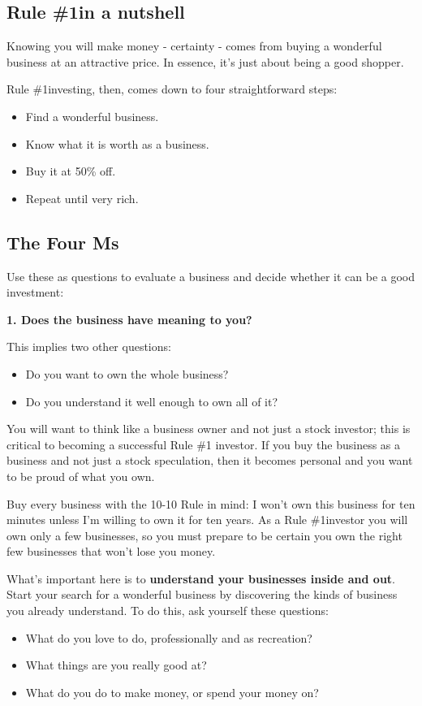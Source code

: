 \documentclass[a4paper]{jpconf}
\newcommand{\ruleone}{Rule \#1\space}
\begin{document}
\subsection{\ruleone in a nutshell}

Knowing you will make money - certainty - comes from buying a
wonderful business at an attractive price. In essence, it's just about
being a good shopper. 

\ruleone investing, then, comes down to four straightforward steps:
\begin{itemize}
\item Find a wonderful business.
\item Know what it is worth as a business.
\item Buy it at 50\% off.
\item Repeat until very rich.
\end{itemize}

\subsection{The Four Ms}

Use these as questions to evaluate a business and decide whether it
can be a good investment: 

{\bf 1. Does the business have meaning to you?}

This implies two other questions:
\begin{itemize}
\item Do you want to own the whole business?
\item Do you understand it well enough to own all of it?
\end{itemize}

You will want to think like a business owner and not just a stock
investor; this is critical to becoming a successful \ruleone
investor. If you buy the business as a business and not just a stock
speculation, then it becomes personal and you want to be proud of what
you own. 

Buy every business with the 10-10 Rule in mind: I won't own this
business for ten minutes unless I'm willing to own it for ten
years. As a \ruleone investor you will own only a few businesses, so
you must prepare to be certain you own the right few businesses that
won't lose you money. 

What's important here is to {\bf understand your businesses inside and
  out}. Start your search for a wonderful business by discovering the
kinds of business you already understand. To do this, ask yourself
these questions:

\begin{itemize}
\item What do you love to do, professionally and as recreation?
\item What things are you really good at?
\item What do you do to make money, or spend your money on?
\end{itemize}
\end{document}
